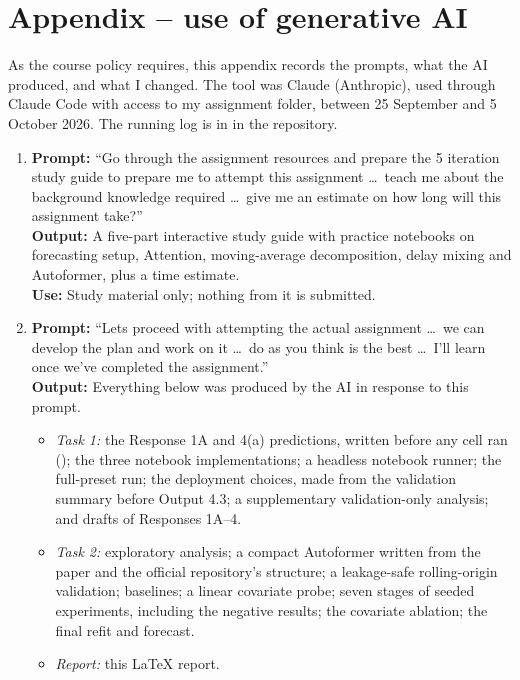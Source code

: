 \section*{Appendix -- use of generative AI}

As the course policy requires, this appendix records the prompts, what the AI produced, and what I changed. The
tool was Claude (Anthropic), used through Claude Code with access to my assignment folder, between 25 September and 5 October 2026. The running log is in  in the repository.

\begin{enumerate}
  \item \textbf{Prompt:} ``Go through the assignment resources and prepare the 5 iteration study guide to prepare me to attempt this assignment \ldots\ teach me about the background knowledge required \ldots\ give me an estimate on how long will this assignment take?''\\
  \textbf{Output:} A five-part interactive study guide with practice notebooks on forecasting setup, Attention, moving-average decomposition, delay mixing and Autoformer, plus a time estimate.\\
  \textbf{Use:} Study material only; nothing from it is submitted.

  \item \textbf{Prompt:} ``Lets proceed with attempting the actual assignment \ldots\ we can develop the plan and work on it \ldots\ do as you think is the best \ldots\ I'll learn once we've completed the assignment.''\\
  \textbf{Output:} Everything below was produced by the AI in response to this prompt.
  \begin{itemize}
    \item \emph{Task 1:} the Response 1A and 4(a) predictions, written before any cell ran (); the three notebook implementations; a headless notebook runner; the full-preset run; the deployment choices, made from the validation summary before Output 4.3; a supplementary validation-only analysis; and drafts of Responses 1A--4.
    \item \emph{Task 2:} exploratory analysis; a compact Autoformer written from the paper and the official repository's structure; a leakage-safe rolling-origin validation; baselines; a linear covariate probe; seven stages of seeded experiments, including the negative results; the covariate ablation; the final refit and forecast.
    \item \emph{Report:} this LaTeX report.
  \end{itemize}


\end{enumerate}
